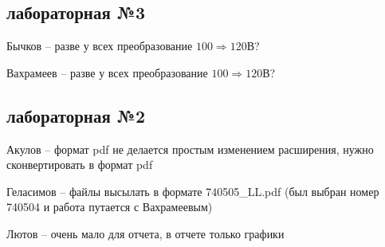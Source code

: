 \documentclass[a4paper,11pt]{article}
\begin{document}
\newpage
\subsection*{лабораторная №3}

Бычков -- разве у всех преобразование $100 \Rightarrow 120$В?

Вахрамеев -- разве у всех преобразование $100 \Rightarrow 120$В?

\subsection*{лабораторная №2}
Акулов -- формат pdf не делается простым изменением расширения, нужно сконвертировать в формат pdf

Геласимов -- файлы высылать в формате 740505\_LL.pdf (был выбран номер 740504 и работа путается с Вахрамеевым)

Лютов -- очень мало для отчета, в отчете только графики
\end{document}
